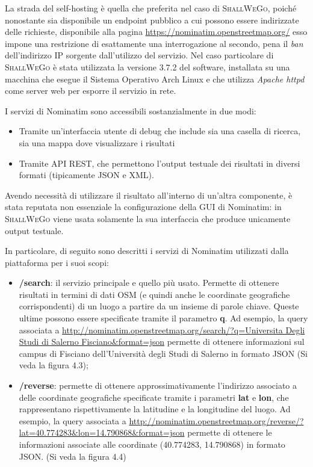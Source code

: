         La strada del self-hosting è quella che preferita nel caso di \textsc{ShallWeGo}, poiché nonostante sia disponibile un endpoint pubblico a cui possono essere indirizzate delle richieste, disponibile alla pagina \url{https://nominatim.openstreetmap.org/} esso impone una restrizione di esattamente una interrogazione al secondo, pena il \textit{ban} dell'indirizzo IP sorgente dall'utilizzo del servizio. 
        Nel caso particolare di \textsc{ShallWeGo} è stata utilizzata la versione 3.7.2 del software, installata su una macchina che esegue il Sistema Operativo Arch Linux e che utilizza \textit{Apache httpd} come server web per esporre il servizio in rete.

        I servizi di Nominatim sono accessibili sostanzialmente in due modi: 
        
        \begin{itemize}
            \item Tramite un'interfaccia utente di debug che include sia una casella di ricerca, sia una mappa dove visualizzare i risultati
            \item Tramite API REST, che permettono l'output testuale dei risultati in diversi formati (tipicamente JSON e XML).
        \end{itemize}

        Avendo necessità di utilizzare il risultato all'interno di un'altra componente, è stata reputata non essenziale la configurazione della GUI di Nominatim: in \textsc{ShallWeGo} viene usata solamente la sua interfaccia che produce unicamente output testuale.

        In particolare, di seguito sono descritti i servizi di Nominatim utilizzati dalla piattaforma per i suoi scopi:

        \begin{itemize}
            \item \textbf{/search}: il servizio principale e quello più usato. Permette di ottenere risultati in termini di dati OSM (e quindi anche le coordinate geografiche corrispondenti) di un luogo a partire da un insieme di parole chiave. Queste ultime possono essere specificate tramite il parametro \textbf{q}. Ad esempio, la query associata a  \url{http://nominatim.openstreetmap.org/search/?q=Universita Degli Studi di Salerno Fisciano&format=json} permette di ottenere informazioni sul campus di Fisciano dell'Università degli Studi di Salerno in formato JSON (Si veda la figura 4.3);
            \item \textbf{/reverse}: permette di ottenere approssimativamente l'indirizzo associato a delle coordinate geografiche specificate tramite i parametri \textbf{lat} e \textbf{lon}, che rappresentano rispettivamente la latitudine e la longitudine del luogo. Ad esempio, la query associata a \url{http://nominatim.openstreetmap.org/reverse/?lat=40.774283&lon=14.790868&format=json} permette di ottenere le informazioni associate alle coordinate (40.774283, 14.790868) in formato JSON. (Si veda la figura 4.4)
        \end{itemize}

